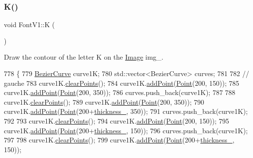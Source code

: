 \subsubsection{\texorpdfstring{K()}{K()}}
{\footnotesize\ttfamily void Font\+V1\+::K (\begin{DoxyParamCaption}{ }\end{DoxyParamCaption})}



Draw the contour of the letter K on the \mbox{\hyperlink{class_image}{Image}} img\+\_\+. 


\begin{DoxyCode}
778               \{
779     \mbox{\hyperlink{class_bezier_curve}{BezierCurve}} curve1K;
780     std::vector<BezierCurve> curves;
781 
782     \textcolor{comment}{// gauche}
783     curve1K.\mbox{\hyperlink{class_bezier_curve_a0ba8ce66d5af5971ae6a1b506029728e}{clearPoints}}();
784     curve1K.\mbox{\hyperlink{class_bezier_curve_a38d16c18b36ae45619b05e26e226cf34}{addPoint}}(\mbox{\hyperlink{class_point}{Point}}(200, 150));
785     curve1K.\mbox{\hyperlink{class_bezier_curve_a38d16c18b36ae45619b05e26e226cf34}{addPoint}}(\mbox{\hyperlink{class_point}{Point}}(200, 350));
786     curves.push\_back(curve1K);
787 
788     curve1K.\mbox{\hyperlink{class_bezier_curve_a0ba8ce66d5af5971ae6a1b506029728e}{clearPoints}}();
789     curve1K.\mbox{\hyperlink{class_bezier_curve_a38d16c18b36ae45619b05e26e226cf34}{addPoint}}(\mbox{\hyperlink{class_point}{Point}}(200, 350));
790     curve1K.\mbox{\hyperlink{class_bezier_curve_a38d16c18b36ae45619b05e26e226cf34}{addPoint}}(\mbox{\hyperlink{class_point}{Point}}(200+\mbox{\hyperlink{class_font_v1_aed8040e76be9a52833627b92f0fb4e5f}{thickness\_}}, 350));
791     curves.push\_back(curve1K);
792 
793     curve1K.\mbox{\hyperlink{class_bezier_curve_a0ba8ce66d5af5971ae6a1b506029728e}{clearPoints}}();
794     curve1K.\mbox{\hyperlink{class_bezier_curve_a38d16c18b36ae45619b05e26e226cf34}{addPoint}}(\mbox{\hyperlink{class_point}{Point}}(200, 150));
795     curve1K.\mbox{\hyperlink{class_bezier_curve_a38d16c18b36ae45619b05e26e226cf34}{addPoint}}(\mbox{\hyperlink{class_point}{Point}}(200+\mbox{\hyperlink{class_font_v1_aed8040e76be9a52833627b92f0fb4e5f}{thickness\_}}, 150));
796     curves.push\_back(curve1K);
797 
798     curve1K.\mbox{\hyperlink{class_bezier_curve_a0ba8ce66d5af5971ae6a1b506029728e}{clearPoints}}();
799     curve1K.\mbox{\hyperlink{class_bezier_curve_a38d16c18b36ae45619b05e26e226cf34}{addPoint}}(\mbox{\hyperlink{class_point}{Point}}(200+\mbox{\hyperlink{class_font_v1_aed8040e76be9a52833627b92f0fb4e5f}{thickness\_}}, 150));

\end{DoxyCode}
